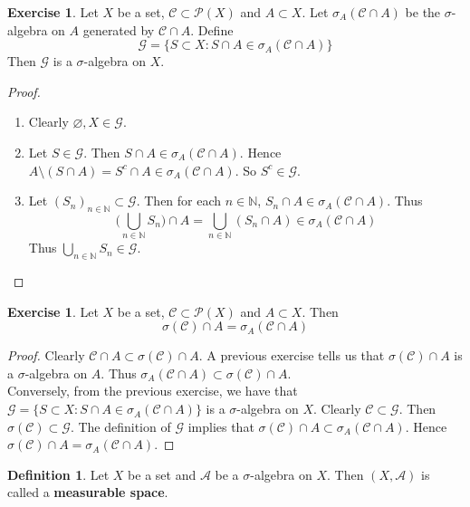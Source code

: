 \documentclass[12pt]{amsart}
\theoremstyle{definition}
\newtheorem{defn}[definition]{Definition}
\newtheorem{ex}[definition]{Exercise}
\newcommand{\sig}{\sigma}
\newcommand{\N}{\mathbb{N}}
\newcommand{\MA}{\mathcal{A}}
\newcommand{\MC}{\mathcal{C}}
\newcommand{\MG}{\mathcal{G}}
\newcommand{\MP}{\mathcal{P}}
\newcommand{\lex}[1]{\label{ex:#1}}
\newcommand{\ld}[1]{\label{defn:#1}}
\begin{document}
	\begin{ex} \lex{00000} 
		Let $X$ be a set, $\MC \subset \MP(X)$ and $A \subset X$. Let $\sig_A(\MC \cap A)$ be the $\sig$-algebra on $A$ generated by $\MC \cap A$. Define $$\MG = \{S \subset X: S \cap A \in \sig_A(\MC \cap A)\}$$ 
		Then $\MG$ is a $\sig$-algebra on $X$. 
	\end{ex}
	
	\begin{proof}
		\begin{enumerate}
			\item Clearly $\varnothing, X \in \MG$. 
			\item Let $S \in \MG$. Then $S \cap A \in \sig_A(\MC \cap A)$. Hence $A \setminus (S \cap A)  = S^c \cap A \in \sig_A(\MC \cap A)$. So $S^c \in \MG$. 
			\item Let $(S_n)_{n \in \N} \subset \MG$. Then for each $n \in \N$, $S_n \cap A \in \sig_A(\MC \cap A)$. Thus $$\bigg( \bigcup_{n \in \N} S_n \bigg) \cap A = \bigcup\limits_{n \in \N}(S_n \cap A) \in \sig_A(\MC \cap A)$$ Thus $\bigcup\limits_{n \in \N} S_n \in \MG$.
		\end{enumerate}
	\end{proof}
	
	\begin{ex} \lex{00000} 
		Let $X$ be a set, $\MC \subset \MP(X)$ and $A \subset X$. Then $$\sig(\MC) \cap A = \sig_A(\MC \cap A)$$
	\end{ex}
	
	\begin{proof}
		Clearly $\MC \cap A \subset \sig(\MC) \cap A$. A previous exercise tells us that $\sig(\MC) \cap A$ is a $\sig$-algebra on $A$. Thus $\sig_A(\MC \cap A) \subset \sig(\MC) \cap A$. \vspace{3mm}\\ Conversely, from the previous exercise, we have that $\MG = \{S \subset X: S \cap A \in \sig_A(\MC \cap A)\}$ is a $\sig$-algebra on $X$. Clearly $\MC \subset \MG$. Then $\sig(\MC) \subset \MG$. The definition of $\MG$ implies that $\sig(\MC) \cap A \subset \sig_A(\MC \cap A)$. Hence $\sig(\MC) \cap A = \sig_A(\MC \cap A)$.
	\end{proof}
	
	\begin{defn} \ld{00000} 
		Let $X$ be a set and $\MA$ be a $\sig$-algebra on $X$. Then $(X, \MA)$ is called a \textbf{measurable space}.
	\end{defn}
	
	
	
	
	
\end{document}
